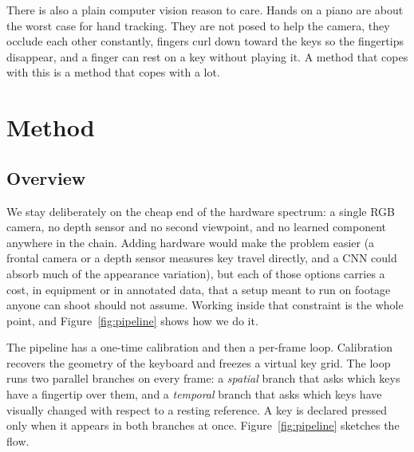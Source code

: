 \documentclass[11pt]{article}
\begin{document}
There is also a plain computer vision reason to care. Hands on a piano are about
the worst case for hand tracking. They are not posed to help the camera, they
occlude each other constantly, fingers curl down toward the keys so the
fingertips disappear, and a finger can rest on a key without playing it. A
method that copes with this is a method that copes with a lot.

\section{Method}

\subsection{Overview}
We stay deliberately on the cheap end of the hardware spectrum: a single RGB
camera, no depth sensor and no second viewpoint, and no learned component
anywhere in the chain. Adding hardware would make the problem easier (a frontal
camera or a depth sensor measures key travel directly,
and a CNN could absorb much of the appearance variation), but each of those
options carries a cost, in equipment or in annotated data, that a setup meant to
run on footage anyone can shoot should not assume. Working inside that
constraint is the whole point, and Figure~\ref{fig:pipeline} shows how we do it.

The pipeline has a one-time calibration and then a per-frame loop. Calibration
recovers the geometry of the keyboard and freezes a virtual key grid. The loop
runs two parallel branches on every frame: a \emph{spatial} branch that asks
which keys have a fingertip over them, and a \emph{temporal} branch that asks
which keys have visually changed with respect to a resting reference. A key is
declared pressed only when it appears in both branches at once. Figure~\ref{fig:pipeline}
sketches the flow.
\end{document}
